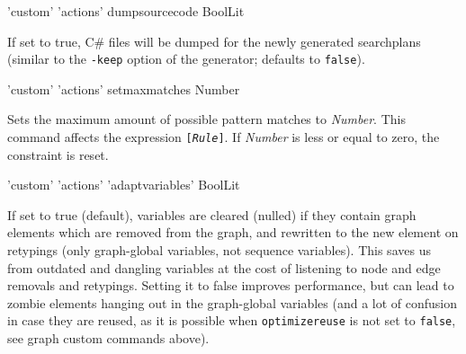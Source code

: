\begin{rail}
  'custom' 'actions' dumpsourcecode BoolLit
\end{rail}
If set to true, C\# files will be dumped for the newly generated searchplans (similar to the \texttt{-keep} option of the generator; defaults to \texttt{false}).

\begin{rail}
  'custom' 'actions' setmaxmatches Number
\end{rail}
Sets the maximum amount of possible pattern matches to \emph{Number}.
This command affects the expression \texttt{[\emph{Rule}]}.
If \emph{Number} is less or equal to zero, the constraint is reset.

\begin{rail}
  'custom' 'actions' 'adaptvariables' BoolLit
\end{rail}
If set to true (default), variables are cleared (nulled) if they contain graph elements which are removed from the graph, and rewritten to the new element on retypings (only graph-global variables, not sequence variables).
This saves us from outdated and dangling variables at the cost of listening to node and edge removals and retypings.
Setting it to false improves performance, but can lead to zombie elements hanging out in the graph-global variables (and a lot of confusion in case they are reused, as it is possible when \texttt{optimizereuse} is not set to \texttt{false}, see graph custom commands above).

